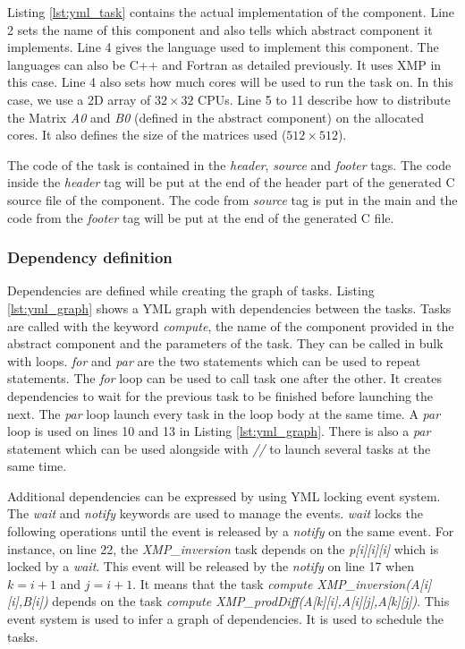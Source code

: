 Listing \ref{lst:yml_task} contains the actual implementation of the component.
Line 2 sets the name of this component and also tells which abstract component it implements.
Line 4 gives the language used to implement this component.
The languages can also be C++ and Fortran as detailed previously.
It uses XMP in this case.
Line 4 also sets how much cores will be used to run the task on.
In this case, we use a 2D array of $32 \times 32$ CPUs.
Line 5 to 11 describe how to distribute the Matrix \textit{A0} and \textit{B0} (defined in the abstract component) on the allocated cores.
It also defines the size of the matrices used ($512 \times 512$).

The code of the task is contained in the \textit{header}, \textit{source} and \textit{footer} tags.
The code inside the \textit{header} tag will be put at the end of the header part of the generated C source file of the component.
The code from \textit{source} tag is put in the main and the code from the \textit{footer} tag will be put at the end of the generated C file.

\subsubsection{Dependency definition}
Dependencies are defined while creating the graph of tasks.
Listing \ref{lst:yml_graph} shows a YML graph with dependencies between the tasks.
Tasks are called with the keyword \textit{compute}, the name of the component provided in the abstract component and the parameters of the task.
They can be called in bulk with loops.
\textit{for} and \textit{par} are the two statements which can be used to repeat statements.
The \textit{for} loop can be used to call task one after the other.
It creates dependencies to wait for the previous task to be finished before launching the next.
The \textit{par} loop launch every task in the loop body at the same time.
A \textit{par} loop is used on lines 10 and 13 in Listing \ref{lst:yml_graph}.
There is also a \textit{par} statement which can be used alongside with \textit{//} to launch several tasks at the same time.

Additional dependencies can be expressed by using YML locking event system.
The \textit{wait} and \textit{notify} keywords are used to manage the events.
\textit{wait} locks the following operations until the event is released by a \textit{notify} on the same event.
For instance, on line 22, the \textit{XMP\_inversion} task depends on the \textit{p[i][i][i]} which is locked by a \textit{wait}.
This event will be released by the \textit{notify} on line 17 when $k = i + 1$ and $j= i + 1$.
It means that the task \textit{compute XMP\_inversion(A[i][i],B[i])} depends on the task \textit{compute XMP\_prodDiff(A[k][i],A[i][j],A[k][j])}.
This event system is used to infer a graph of dependencies.
It is used to schedule the tasks.

